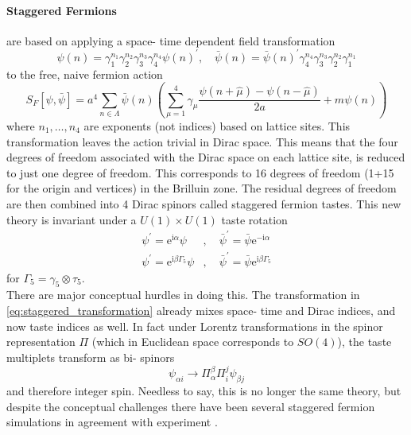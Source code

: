\documentclass[a4paper,10pt]{book}
\begin{document}
\paragraph{Staggered Fermions} are based on applying a space- time dependent field transformation 
\begin{equation}\label{eq:staggered_transformation}
\psi(n)=\gamma_{1}^{n_{1}} \gamma_{2}^{n_{2}} \gamma_{3}^{n_{3}} \gamma_{4}^{n_{4}} \psi(n)^{\prime}, \quad \bar{\psi}(n)=\bar{\psi}(n)^{\prime} \gamma_{4}^{n_{4}} \gamma_{3}^{n_{3}} \gamma_{2}^{n_{2}} \gamma_{1}^{n_{1}}
\end{equation}
to the free, naive fermion action
\begin{equation}
S_{F}[\psi, \bar{\psi}]=a^{4} \sum_{n \in \Lambda} \bar{\psi}(n)\left(\sum_{\mu=1}^{4} \gamma_{\mu} \frac{\psi(n+\hat{\mu})-\psi(n-\hat{\mu})}{2 a}+m \psi(n)\right)
\end{equation}
where $n_1,\ldots,n_4$ are exponents (not indices) based on lattice sites. This transformation leaves the action trivial in Dirac space. This means that the four degrees of freedom associated with the Dirac space on each lattice site, is reduced to just one degree of freedom. This corresponds to 16 degrees of freedom (1+15 for the origin and vertices) in the Brilluin zone. The residual degrees of freedom are then combined into 4 Dirac spinors called staggered fermion tastes. This new theory is invariant under a $U(1)\times U(1)$ taste rotation 
\begin{equation}
\begin{aligned}
\psi^{\prime}=\mathrm{e}^{\mathrm{i} \alpha} \psi &, \quad \bar{\psi}^{\prime}=\bar{\psi} \mathrm{e}^{-\mathrm{i} \alpha} \\
\psi^{\prime}=\mathrm{e}^{\mathrm{i} \beta \Gamma_{5}} \psi &, \quad \bar{\psi}^{\prime}=\bar{\psi} \mathrm{e}^{\mathrm{i} \beta \Gamma_{5}}
\end{aligned}
\end{equation}
for $\Gamma_{5}=\gamma_{5} \otimes \tau_{5}$.\\There are major conceptual hurdles in doing this. The transformation in \eqref{eq:staggered_transformation} already mixes space- time and Dirac indices, and now taste indices as well. In fact under Lorentz transformations in the spinor representation $\Pi$ (which in Euclidean space corresponds to $SO(4)$), the taste multiplets transform as bi- spinors
\begin{equation}
\psi_{\alpha i} \rightarrow \Pi_{\alpha}^{\beta} \Pi_{i}^{j} \psi_{\beta j}
\end{equation}
and therefore integer spin. Needless to say, this is no longer the same theory, but despite the conceptual challenges there have been several staggered fermion simulations in agreement with experiment \cite{PhysRevLett.92.022001}\cite{Follana:2006rc}.
\end{document}
